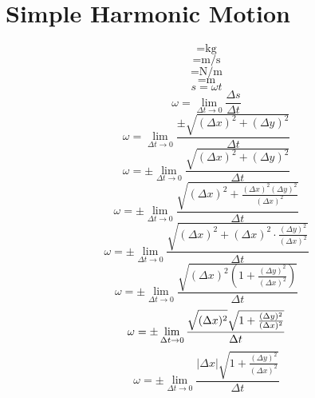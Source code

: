 \documentclass[a4paper,12pt]{report}
\begin{document}
\section*{Simple Harmonic Motion}
\begin{equation}
[m] = \text{kg}
\end{equation}
\begin{equation}
[\omega] = \text{m/s}
\end{equation}
\begin{equation}
[k] = \text{N/m}
\end{equation}
\begin{equation}
[r] = \text{m}
\end{equation}
\begin{equation}
s = \omega t
\end{equation}
\begin{equation}
\omega = \lim \limits_{\Delta t \to 0} \frac{\Delta s}{\Delta t}
\end{equation}
\begin{equation}
\omega = \lim \limits_{\Delta t \to 0} \frac{\pm \sqrt{(\Delta x)^2 + (\Delta y)^2}}{\Delta t}
\end{equation}
\begin{equation}
\omega = \pm \lim \limits_{\Delta t \to 0} \frac{\sqrt{(\Delta x)^2 + (\Delta y)^2}}{\Delta t}
\end{equation}
\begin{equation}
\omega = \pm \lim \limits_{\Delta t \to 0} \frac{\sqrt{(\Delta x)^2 + \frac{(\Delta x)^2 (\Delta y)^2}{(\Delta x)^2}}}{\Delta t}
\end{equation}
\begin{equation}
\omega = \pm \lim \limits_{\Delta t \to 0} \frac{\sqrt{(\Delta x)^2 + (\Delta x)^2 \cdot \frac{(\Delta y)^2}{(\Delta x)^2}}}{\Delta t}
\end{equation}
\begin{equation}
\omega = \pm \lim \limits_{\Delta t \to 0} \frac{\sqrt{(\Delta x)^2 \left(1 + \frac{(\Delta y)^2}{(\Delta x)^2}\right)}}{\Delta t}
\end{equation}
\begin{equation}
\omega = \pm \lim \limits_{\Delta t \to 0} \frac{\sqrt{\vphantom{1 + \frac{(\Delta y)^2}{(\Delta x)^2}} (\Delta x)^2} \sqrt{1 + \frac{(\Delta y)^2}{(\Delta x)^2}}}{\Delta t}
\end{equation}
\begin{equation}
\omega = \pm \lim \limits_{\Delta t \to 0} \frac{|\Delta x| \sqrt{1 + \frac{(\Delta y)^2}{(\Delta x)^2}}}{\Delta t}
\end{equation}
\end{document}
